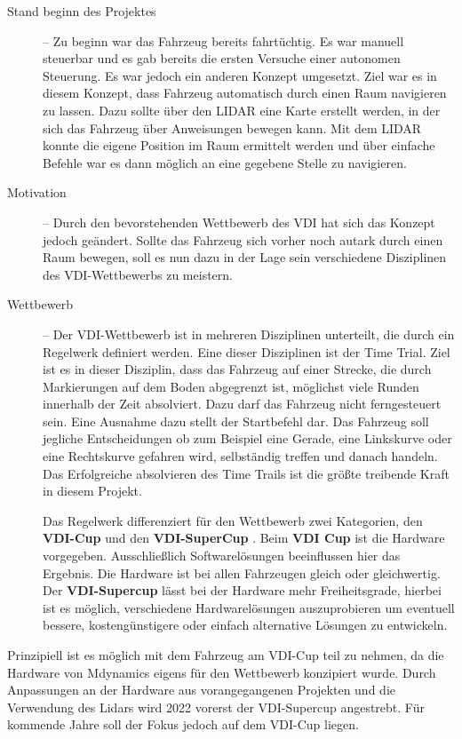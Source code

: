 \begin{description}
    \item [Stand beginn des Projektes] --
    Zu beginn war das Fahrzeug bereits fahrtüchtig. Es war manuell steuerbar und es gab bereits die ersten Versuche einer autonomen Steuerung. Es war jedoch ein anderen Konzept umgesetzt. Ziel war es in diesem Konzept, dass Fahrzeug automatisch durch einen Raum navigieren zu lassen. Dazu sollte über den LIDAR eine Karte erstellt werden, in der sich das Fahrzeug über Anweisungen bewegen kann. Mit dem LIDAR konnte die eigene Position im Raum ermittelt werden und über einfache Befehle war es dann möglich an eine gegebene Stelle zu navigieren. 

    \item [Motivation] --
    Durch den bevorstehenden Wettbewerb des VDI hat sich das Konzept jedoch geändert. 
    Sollte das Fahrzeug sich vorher noch autark durch einen Raum bewegen, soll es nun dazu in der Lage sein verschiedene Disziplinen des VDI-Wettbewerbs zu meistern. 
    
    \item [Wettbewerb] --
    Der VDI-Wettbewerb ist in mehreren Disziplinen unterteilt, die durch ein Regelwerk definiert werden. 
    Eine dieser Disziplinen ist der Time Trial. 
    Ziel ist es in dieser Disziplin, dass das Fahrzeug auf einer Strecke, die durch Markierungen auf dem Boden abgegrenzt ist, möglichst viele Runden innerhalb der Zeit absolviert.\citep[11]{VDI-adc-Regelwerk} Dazu darf das Fahrzeug nicht ferngesteuert sein. 
    Eine Ausnahme dazu stellt der Startbefehl dar. Das Fahrzeug soll jegliche Entscheidungen ob zum Beispiel eine Gerade, eine Linkskurve oder eine Rechtskurve gefahren wird, selbständig treffen und danach handeln. Das Erfolgreiche absolvieren des Time Trails ist die größte treibende Kraft in diesem Projekt.
    
    Das Regelwerk differenziert für den Wettbewerb zwei Kategorien, den \textbf{VDI-Cup} und den \textbf{VDI-SuperCup} \citep[5]{VDI-adc-Regelwerk}. Beim \textbf{VDI Cup} ist die Hardware vorgegeben. Ausschließlich Softwarelösungen beeinflussen hier das Ergebnis. Die Hardware ist bei allen Fahrzeugen gleich oder gleichwertig. Der \textbf{VDI-Supercup} lässt bei der Hardware mehr Freiheitsgrade, hierbei ist es möglich, verschiedene Hardwarelösungen auszuprobieren um eventuell bessere, kostengünstigere oder einfach alternative Lösungen zu entwickeln.
\end{description}%

Prinzipiell ist es möglich mit dem Fahrzeug am VDI-Cup teil zu nehmen, da die Hardware von Mdynamics eigens für den Wettbewerb konzipiert wurde. Durch Anpassungen an der Hardware aus vorangegangenen Projekten und die Verwendung des Lidars wird 2022 vorerst der VDI-Supercup angestrebt. Für kommende Jahre soll der Fokus jedoch auf dem VDI-Cup liegen.

